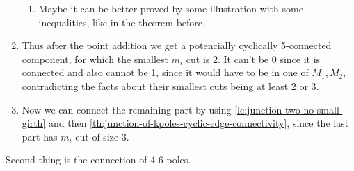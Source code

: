 \documentclass[12pt, twoside]{book}
\begin{document}
\begin{enumerate}
\begin{enumerate}
		\item Maybe it can be better proved by some illustration with some inequalities, like in the theorem before.
	\end{enumerate}
	\item Thus after the point addition we get a potencially cyclically 5-connected component, for which the smallest $m_i$ cut is 2. It can't be 0 since it is connected and also cannot be 1, since it would have to be in one of $M_1,M_2$, contradicting the facts about their smallest cuts being at least 2 or 3.
	\item Now we can connect the remaining part by using \cref{le:junction-two-no-small-girth} and then \cref{th:junction-of-kpoles-cyclic-edge-connectivity}, since the last part has $m_i$ cut of size 3.
\end{enumerate}



Second thing is the connection of 4 6-poles.
\end{document}

